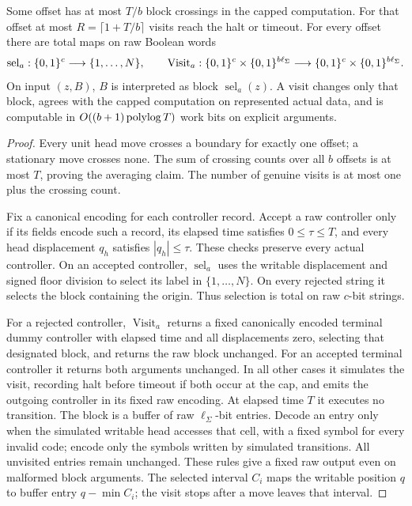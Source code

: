 \begin{lemma}
\label{lem:visits}
Some offset has at most \(T/b\) block crossings in the capped
computation. For that offset at most
\(R=\lceil1+T/b\rceil\) visits reach the halt or timeout.
For every offset there are total maps on raw Boolean words
\[
 \operatorname{sel}_a:\{0,1\}^c\longrightarrow\{1,\ldots,N\},
 \qquad
 \operatorname{Visit}_a:
 \{0,1\}^c\times\{0,1\}^{b\ell_\Sigma}
 \longrightarrow \{0,1\}^c\times\{0,1\}^{b\ell_\Sigma}.
\]
On input \((z,B)\), \(B\) is interpreted as block
\(\operatorname{sel}_a(z)\). A visit changes only that block, agrees
with the capped computation on
represented actual data, and is computable in
\(O((b+1)\operatorname{polylog} T)\) work bits on explicit arguments.
\end{lemma}

\begin{proof}
Every unit head move crosses a boundary for exactly one offset;
a stationary move crosses none. The sum of crossing counts over all
\(b\) offsets is at most \(T\), proving the averaging claim.
The number of genuine visits is at most one plus the crossing count.

Fix a canonical encoding for each controller record. Accept a raw
controller only if its fields encode such a record, its elapsed time
satisfies \(0\le\tau\le T\), and every head displacement \(q_h\)
satisfies \(|q_h|\le\tau\). These checks preserve every actual
controller. On an accepted controller, \(\operatorname{sel}_a\)
uses the writable displacement and signed floor division to select
its label in \(\{1,\ldots,N\}\). On every rejected string it selects
the block containing the origin. Thus selection is total on raw
\(c\)-bit strings.

For a rejected controller, \(\operatorname{Visit}_a\) returns a fixed
canonically encoded terminal dummy controller with elapsed time and
all displacements zero,
selecting that designated block, and returns the raw block unchanged.
For an accepted terminal
controller it returns both arguments unchanged. In all other cases it
simulates the visit, recording halt before timeout if both occur at
the cap, and emits the outgoing controller in its fixed raw encoding.
At elapsed time \(T\) it executes no transition. The block is a buffer
of raw \(\ell_\Sigma\)-bit entries. Decode an entry only when the
simulated writable head accesses that cell, with a fixed symbol for
every invalid code; encode only the symbols written by simulated
transitions. All unvisited entries remain unchanged. These rules give
a fixed raw output even on malformed block arguments. The selected
interval \(C_i\) maps the writable position \(q\) to buffer entry
\(q-\min C_i\); the visit stops after a move leaves that interval.


\end{proof}
